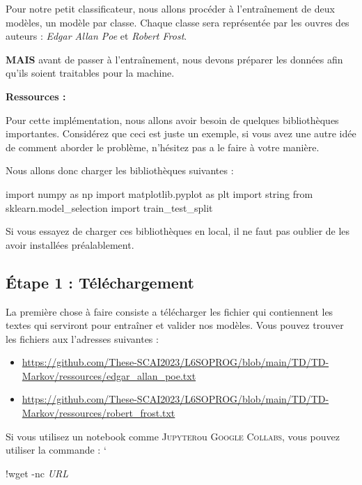 \vspace{0.5cm}
Pour notre petit classificateur, nous allons procéder à l’entraînement de deux modèles, un modèle par classe. Chaque classe sera représentée par les ouvres des auteurs : \textit{Edgar Allan Poe} et \textit{Robert Frost}. 

\textbf{MAIS} avant de passer à l'entraînement, nous devons préparer les données afin qu'ils soient traitables pour la machine.

\textbf{Ressources : }

Pour cette implémentation, nous allons avoir besoin de quelques bibliothèques importantes. Considérez que ceci est juste un exemple, si vous avez une autre idée de comment aborder le problème, n’hésitez pas a le faire à votre manière.

Nous allons donc charger les bibliothèques suivantes :

\begin{python}
import numpy as np
import matplotlib.pyplot as plt
import string
from sklearn.model_selection import train_test_split
\end{python}

Si vous essayez de charger ces bibliothèques en local, il ne faut pas oublier de les avoir installées préalablement.

\vspace{0.5cm}

\subsection{Étape 1 : Téléchargement}

La première chose à faire consiste a télécharger les fichier qui contiennent les textes qui serviront pour entraîner et valider nos modèles. Vous pouvez trouver les fichiers aux l'adresses suivantes :

\begin{itemize}
\item \url{https://github.com/These-SCAI2023/L6SOPROG/blob/main/TD/TD-Markov/ressources/edgar_allan_poe.txt}
\item \url{https://github.com/These-SCAI2023/L6SOPROG/blob/main/TD/TD-Markov/ressources/robert_frost.txt}
\end{itemize}

Si vous utilisez un notebook comme \textsc{Jupyter}ou \textsc{Google Collabs}, vous pouvez utiliser la commande :
`
\begin{python}
!wget -nc \textit{URL}
\end{python}
 
